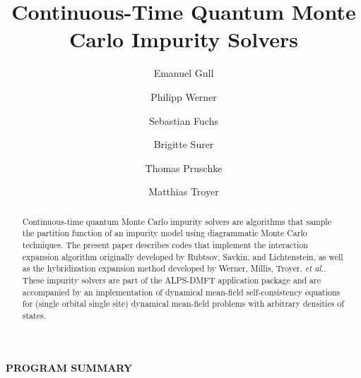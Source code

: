 \documentclass[3p,twocolumn]{elsarticle}
\begin{document}
\begin{frontmatter}

\title{Continuous-Time Quantum Monte Carlo Impurity Solvers}

\author[columbia]{Emanuel Gull} 
\author[eth]{Philipp Werner} 
\author[goettingen]{Sebastian Fuchs} 
\author[eth]{Brigitte Surer} 
\author[goettingen]{Thomas Pruschke} 
\author[eth]{Matthias Troyer}

\address[columbia]{Columbia University, New York, NY 10027, USA}
\address[eth]{ETH Zurich, 8093 Zurich, Switzerland}
\address[goettingen]{Georg-August-Universit\"{a}t G\"{o}ttingen, G\"{o}ttingen, Germany}

\begin{abstract}
Continuous-time quantum Monte Carlo impurity solvers are algorithms that sample the partition function of an impurity model using diagrammatic Monte Carlo techniques. The present paper describes codes that implement the interaction
expansion algorithm originally developed by Rubtsov, Savkin, and Lichtenstein, as well as the hybridization expansion method developed by Werner, Millis, Troyer, {\it et al.}. These impurity solvers are part of the ALPS-DMFT application package and are accompanied by an implementation of dynamical mean-field self-consistency equations for (single orbital single site) dynamical mean-field problems with arbitrary densities of states.
\end{abstract}

\end{frontmatter}
{\bf PROGRAM SUMMARY}
\end{document}
